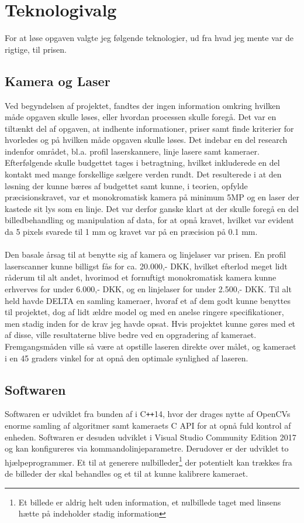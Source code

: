 \newpage

\section{Teknologivalg}
For at løse opgaven valgte jeg følgende teknologier, ud fra hvad jeg mente var de rigtige, til prisen.

\subsection{Kamera og Laser}
Ved begyndelsen af projektet, fandtes der ingen information omkring hvilken måde opgaven skulle løses, eller hvordan processen skulle foregå. Det var en tiltænkt del af opgaven, at indhente informationer, priser samt finde kriterier for hvorledes og på hvilken måde opgaven skulle løses. Det indebar en del research indenfor området, bl.a. profil laserskannere, linje lasere samt kameraer. Efterfølgende skulle budgettet tages i betragtning, hvilket inkluderede en del kontakt med mange forskellige sælgere verden rundt. Det resulterede i at den løsning der kunne bæres af budgettet samt kunne, i teorien, opfylde præcisionskravet, var et monokromatisk kamera på minimum 5MP og en laser der kastede sit lys som en linje. Det var derfor ganske klart at der skulle foregå en del billedbehandling og manipulation af data, for at opnå kravet, hvilket var evident da 5 pixels svarede til 1 mm og kravet var på en præcision på 0.1 mm.\\\\
Den basale årsag til at benytte sig af kamera og linjelaser var prisen. En profil laserscanner kunne billigst fås for ca. 20.000,- DKK, hvilket efterlod meget lidt råderum til alt andet, hvorimod et fornuftigt monokromatisk kamera kunne erhverves for under 6.000,- DKK, og en linjelaser for under 2.500,- DKK. Til alt held havde DELTA en samling kameraer, hvoraf et af dem godt kunne benyttes til projektet, dog af lidt ældre model og med en anelse ringere specifikationer, men stadig inden for de krav jeg havde opsat. Hvis projektet kunne gøres med et af disse, ville resultaterne blive bedre ved en opgradering af kameraet.
Fremgangsmåden ville så være at opstille laseren direkte over målet, og kameraet i en 45 graders vinkel for at opnå den optimale synlighed af laseren.

\subsection{Softwaren}
Softwaren er udviklet fra bunden af i C\texttt{++}14, hvor der drages nytte af OpenCVs enorme samling af algoritmer samt kameraets C API for at opnå fuld kontrol af enheden. Softwaren er desuden udviklet i Visual Studio Community Edition 2017 og kan konfigureres via kommandolinjeparametre. Derudover er der udviklet to hjælpeprogrammer. Et til at generere nulbilleder\footnote{Et billede er aldrig helt uden information, et nulbillede taget med linsens hætte på indeholder stadig information} der potentielt kan trækkes fra de billeder der skal behandles og et til at kunne kalibrere kameraet.
